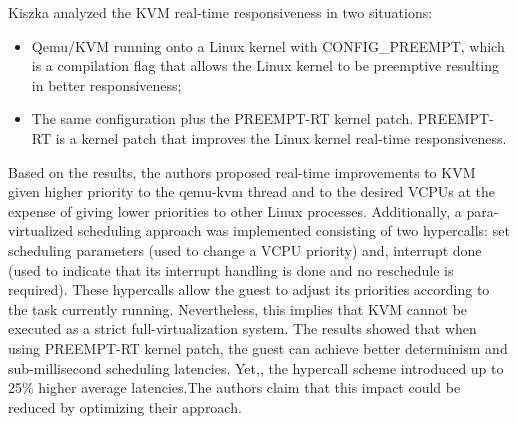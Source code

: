 Kiszka \cite{kiszka2009} analyzed the KVM real-time responsiveness in two situations: 

\begin{itemize}
\item  Qemu/KVM running onto a Linux kernel with CONFIG\_PREEMPT, which is  a compilation flag that allows the Linux kernel to be preemptive resulting in better responsiveness;
\item  The same configuration plus the PREEMPT-RT kernel patch. PREEMPT-RT is a kernel patch that improves the Linux kernel real-time responsiveness.
\end{itemize}
Based on the results, the authors proposed real-time improvements to KVM given higher priority to the qemu-kvm thread and to the desired VCPUs at the expense of giving lower priorities to other Linux processes. Additionally, a para-virtualized scheduling approach was implemented consisting of two hypercalls: set scheduling parameters (used to change a VCPU priority) and, interrupt done (used to indicate that its interrupt handling is done and no reschedule is required). These hypercalls allow the guest to adjust its priorities according to  the task currently running.  Nevertheless, this implies that KVM cannot be executed as a strict full-virtualization system. The results showed that when using PREEMPT-RT kernel patch, the guest can achieve better determinism and sub-millisecond scheduling latencies. Yet,, the hypercall scheme introduced up to 25\% higher average latencies.The authors claim that this impact could be reduced by optimizing their approach. 


